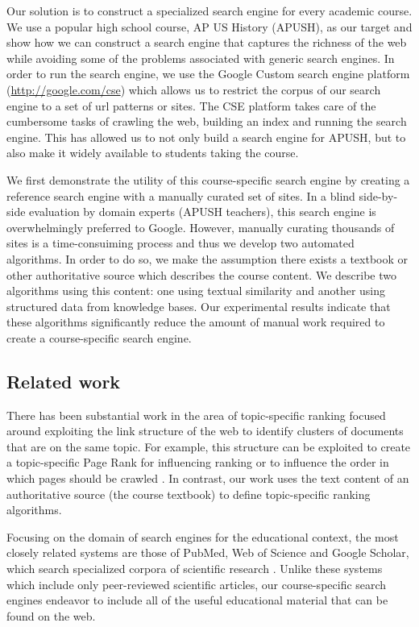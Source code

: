 \documentclass[pdfpagelabels=false,plainpages=true]{acm_proc_article-sp}
\begin{document}
Our solution is to construct a specialized search engine for every academic
course. We use a popular high school course, AP US History (APUSH), as
our target and show how we can construct a search engine that captures the
richness of the web while avoiding some of the problems associated with generic
search engines. In order to run the search engine, we use the Google Custom
search engine platform  (\url{http://google.com/cse}) which allows us to
restrict the corpus of our search engine to a set of url patterns or sites. The
CSE platform takes care of the cumbersome tasks of crawling the web, building an
index and running the search engine. This has allowed us to not only build a
search engine for APUSH, but to also make it widely available to students taking
the course.     

We first demonstrate the utility of this course-specific search engine by creating
a reference search engine with a manually curated set of sites. In a
blind side-by-side evaluation by domain experts (APUSH teachers), this search
engine is overwhelmingly preferred to Google. However, manually curating
thousands of sites is a time-consuiming process and thus we develop two
automated algorithms. In order to do so, we make the assumption there exists a
textbook or other authoritative source which describes the course content.
We describe two algorithms using this content: one using textual similarity and
another using structured data from knowledge bases. Our experimental results
indicate that these algorithms significantly reduce the amount of manual work
required to create a course-specific search engine.

\subsection{Related work}

There has been substantial work in the area of topic-specific ranking focused
around exploiting the link structure of the web to identify clusters of
documents that are on the same topic. For example, this structure can be
exploited to create a topic-specific Page Rank for influencing ranking
\cite{haveliwala2003topic, hsu2006topic} or to influence the order in which
pages should be crawled \cite{buntine2004scalable}. In contrast, our work uses the
text content of an authoritative source (the course textbook) to define
topic-specific ranking algorithms.

Focusing on the domain of search engines for the educational context, the most
closely related systems are those of PubMed, Web of Science and Google
Scholar, which search specialized corpora of scientific research
\cite{jacso2005google}. Unlike these systems which include only
peer-reviewed scientific articles, our course-specific search engines
endeavor to include all of the useful educational material that can be found on
the web. 
\end{document}
